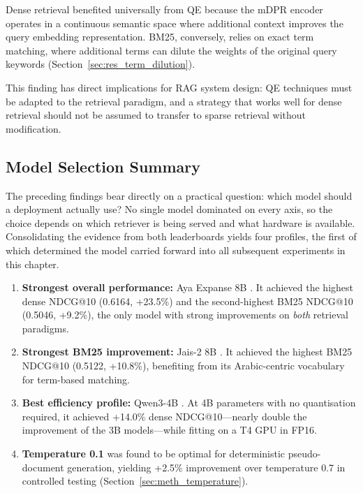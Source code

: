 Dense retrieval benefited universally from QE because the mDPR encoder operates in a continuous semantic space where additional context improves the query embedding representation. BM25, conversely, relies on exact term matching, where additional terms can dilute the weights of the original query keywords (Section~\ref{sec:res_term_dilution}).

This finding has direct implications for RAG system design: QE techniques must be adapted to the retrieval paradigm, and a strategy that works well for dense retrieval should not be assumed to transfer to sparse retrieval without modification.

\subsection{Model Selection Summary}
\label{sec:res_finding_best}

The preceding findings bear directly on a practical question: which model should a deployment actually use? No single model dominated on every axis, so the choice depends on which retriever is being served and what hardware is available. Consolidating the evidence from both leaderboards yields four profiles, the first of which determined the model carried forward into all subsequent experiments in this chapter.

\begin{enumerate}
    \item \textbf{Strongest overall performance:} Aya Expanse 8B \cite{aya_2024}. It achieved the highest dense NDCG@10 (0.6164, +23.5\%) and the second-highest BM25 NDCG@10 (0.5046, +9.2\%), the only model with strong improvements on \emph{both} retrieval paradigms.

    \item \textbf{Strongest BM25 improvement:} Jais-2 8B \cite{sengupta_2023_jais}. It achieved the highest BM25 NDCG@10 (0.5122, +10.8\%), benefiting from its Arabic-centric vocabulary for term-based matching.

    \item \textbf{Best efficiency profile:} Qwen3-4B \cite{qwen3_2025}. At 4B parameters with no quantisation required, it achieved +14.0\% dense NDCG@10---nearly double the improvement of the 3B models---while fitting on a T4 GPU in FP16.

    \item \textbf{Temperature 0.1} was found to be optimal for deterministic pseudo-document generation, yielding +2.5\% improvement over temperature 0.7 in controlled testing (Section~\ref{sec:meth_temperature}).
\end{enumerate}

